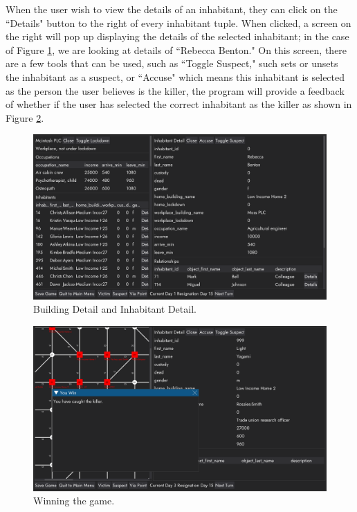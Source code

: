 \documentclass{article}
\begin{document}
When the user wish to view the details of an inhabitant, they can click on the ``Details" button to the right of every inhabitant tuple. When clicked, a screen on the right will pop up displaying the details of the selected inhabitant; in the case of Figure \ref{fig:building_inhabitant_detail}, we are looking at details of ``Rebecca Benton." On this screen, there are a few tools that can be used, such as ``Toggle Suspect," such sets or unsets the inhabitant as a suspect, or ``Accuse" which means this inhabitant is selected as the person the user believes is the killer, the program will provide a feedback of whether if the user has selected the correct inhabitant as the killer as shown in Figure \ref{fig:win}.

\begin{figure}[H]
  \centering
  \includegraphics[width=1\textwidth]{building_inhabitant_detail.png}
  \caption{Building Detail and Inhabitant Detail.}
  \label{fig:building_inhabitant_detail}
\end{figure}

\begin{figure}[H]
  \centering
  \includegraphics[width=1\textwidth]{win.png}
  \caption{Winning the game.}
  \label{fig:win}
\end{figure}
\end{document}
